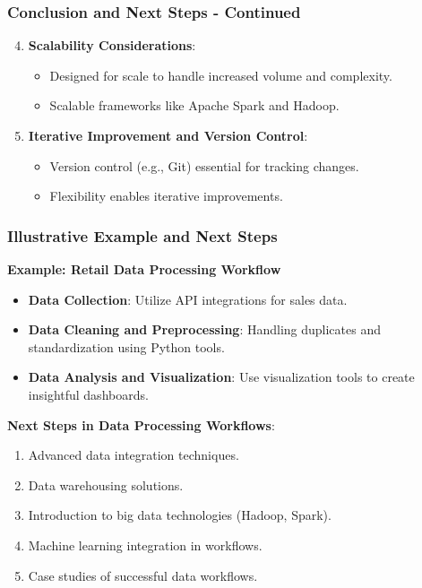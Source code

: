 \documentclass[aspectratio=169]{beamer}
\begin{document}
\begin{frame}[fragile]
    \frametitle{Conclusion and Next Steps - Continued}
    \begin{enumerate}
        \setcounter{enumi}{3}
        \item \textbf{Scalability Considerations}:
        \begin{itemize}
            \item Designed for scale to handle increased volume and complexity.
            \item Scalable frameworks like Apache Spark and Hadoop.
        \end{itemize}

        \item \textbf{Iterative Improvement and Version Control}:
        \begin{itemize}
            \item Version control (e.g., Git) essential for tracking changes.
            \item Flexibility enables iterative improvements.
        \end{itemize}
    \end{enumerate}
\end{frame}

\begin{frame}[fragile]
    \frametitle{Illustrative Example and Next Steps}
    \textbf{Example: Retail Data Processing Workflow}
    \begin{itemize}
        \item \textbf{Data Collection}: Utilize API integrations for sales data.
        \item \textbf{Data Cleaning and Preprocessing}: Handling duplicates and standardization using Python tools.
        \item \textbf{Data Analysis and Visualization}: Use visualization tools to create insightful dashboards.
    \end{itemize}
    
    \textbf{Next Steps in Data Processing Workflows}:
    \begin{enumerate}
        \item Advanced data integration techniques.
        \item Data warehousing solutions.
        \item Introduction to big data technologies (Hadoop, Spark).
        \item Machine learning integration in workflows.
        \item Case studies of successful data workflows.
    \end{enumerate}
\end{frame}
\end{document}

